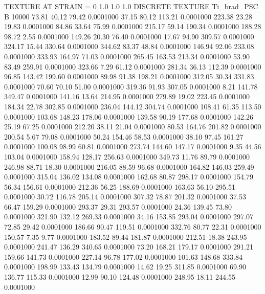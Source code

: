 TEXTURE AT STRAIN = 0
1.0   1.0   1.0
DISCRETE TEXTURE Ti_brad_PSC
B 10000
  73.81   40.12   79.42   0.0001000
  37.15   80.12  113.21   0.0001000
 223.38   23.28   19.83   0.0001000
  84.86   33.64   75.99   0.0001000
 215.17   59.14  190.34   0.0001000
 188.28   98.72    2.55   0.0001000
 149.26   20.30   76.40   0.0001000
  17.67   94.90  309.57   0.0001000
 324.17   15.44  330.64   0.0001000
 344.62   83.37   48.84   0.0001000
 146.94   92.06  233.08   0.0001000
 333.93  164.97   71.03   0.0001000
 265.45  163.53  213.34   0.0001000
  53.90   83.49  259.91   0.0001000
 323.66    7.29   61.12   0.0001000
 281.34   36.13  112.39   0.0001000
  96.85  143.42  199.60   0.0001000
  89.98   91.38  198.21   0.0001000
 312.05   30.34  331.83   0.0001000
  70.60   70.10   51.00   0.0001000
 319.36   91.93  307.05   0.0001000
   8.21  141.78  349.47   0.0001000
 141.16   13.64  214.95   0.0001000
 279.89   19.02  223.45   0.0001000
 184.34   22.78  302.85   0.0001000
 236.04  144.12  304.74   0.0001000
 108.41   61.35  113.50   0.0001000
 103.68  148.23  178.06   0.0001000
 139.58   90.19  177.68   0.0001000
 142.26   25.19   67.25   0.0001000
 212.20   38.11   21.04   0.0001000
  80.53  164.76  201.82   0.0001000
 200.54    5.67   79.08   0.0001000
  50.24  154.46   58.53   0.0001000
  38.10   97.45  161.27   0.0001000
 100.08   98.99   60.81   0.0001000
 273.74  144.60  147.17   0.0001000
   9.35   44.56  103.04   0.0001000
 158.94  128.17  256.63   0.0001000
 349.73   11.76   89.79   0.0001000
 246.98   88.71   18.30   0.0001000
 216.05   88.59   96.68   0.0001000
 164.82  146.03  259.49   0.0001000
 315.04  136.02  134.08   0.0001000
 162.68   80.87  298.17   0.0001000
 154.79   56.34  156.61   0.0001000
 212.36   56.25  188.69   0.0001000
 163.63   56.10  295.51   0.0001000
  30.72  116.78  205.14   0.0001000
 307.32   78.87  201.32   0.0001000
  37.53   66.47  159.29   0.0001000
 293.37   29.31  293.57   0.0001000
  24.36  139.45   73.80   0.0001000
 321.90  132.12  269.33   0.0001000
  34.16  153.85  293.04   0.0001000
 297.07   72.85   29.42   0.0001000
 186.66   90.47  119.51   0.0001000
 332.76   80.77   22.31   0.0001000
 150.57    7.35    9.77   0.0001000
 183.52   89.44  181.87   0.0001000
 212.51   18.38  243.95   0.0001000
 241.47  136.29  340.65   0.0001000
  73.20  168.21  179.17   0.0001000
 291.21  159.66  141.73   0.0001000
 227.14   96.78  177.02   0.0001000
 101.63  148.68  333.84   0.0001000
 198.99  133.43  134.79   0.0001000
  14.62   19.25  311.85   0.0001000
  69.90  136.77  115.33   0.0001000
  12.99   90.10  124.48   0.0001000
 248.95   18.11  244.55   0.0001000
